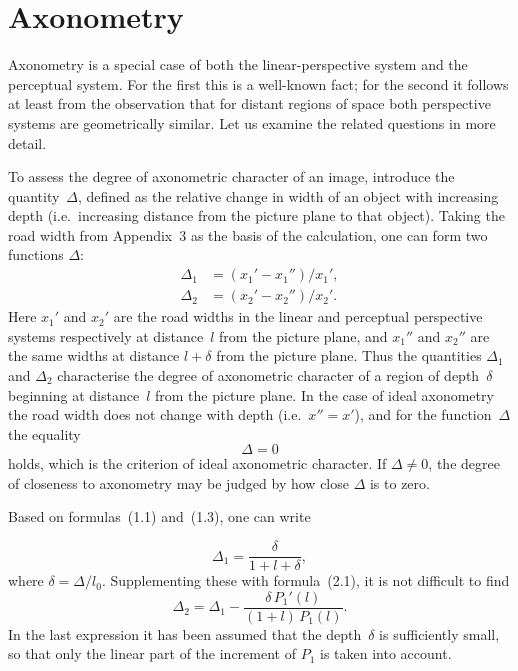
\chapter{Axonometry}


Axonometry is a special case of both the linear-perspective system and the perceptual
system.  For the first this is a well-known fact; for the second it follows at least from the
observation that for distant regions of space both perspective systems are geometrically
similar.  Let us examine the related questions in more detail.

To assess the degree of axonometric character of an image, introduce the quantity~$\Delta$,
defined as the relative change in width of an object with increasing depth (i.e.\ increasing
distance from the picture plane to that object).  Taking the road width from Appendix~3 as
the basis of the calculation, one can form two functions $\Delta$:
\begin{align}
  \Delta_1 &= (x_1' - x_1'')/x_1', \tag{4.1a} \\
  \Delta_2 &= (x_2' - x_2'')/x_2'. \tag{4.1b}
\end{align}
Here $x_1'$ and $x_2'$ are the road widths in the linear and perceptual perspective systems
respectively at distance~$l$ from the picture plane, and $x_1''$ and $x_2''$ are the same
widths at distance $l + \delta$ from the picture plane.  Thus the quantities $\Delta_1$ and
$\Delta_2$ characterise the degree of axonometric character of a region of depth~$\delta$
beginning at distance~$l$ from the picture plane.  In the case of ideal axonometry the road
width does not change with depth (i.e.\ $x'' = x'$), and for the function~$\Delta$ the
equality
\begin{equation}
  \Delta = 0 \tag{4.2}
\end{equation}
holds, which is the criterion of ideal axonometric character.  If $\Delta \neq 0$, the degree
of closeness to axonometry may be judged by how close $\Delta$ is to zero.

Based on formulas~(1.1) and~(1.3), one can write

\begin{equation}
  \Delta_1 = \frac{\delta}{1 + l + \delta},  \tag{4.3}
\end{equation}
where $\delta = \Delta/l_0$.  Supplementing these with formula~(2.1), it is not difficult to
find
\begin{equation}
  \Delta_2 = \Delta_1 - \frac{\delta\,P_1'(l)}{(1+l)\,P_1(l)}.  \tag{4.4}
\end{equation}
In the last expression it has been assumed that the depth~$\delta$ is sufficiently small,
so that only the linear part of the increment of $P_1$ is taken into account.

